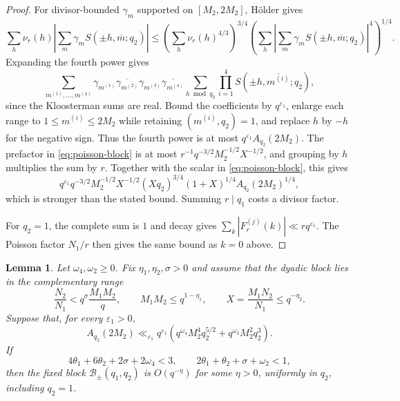 \documentclass[12pt, a4paper]{amsart}
\numberwithin{equation}{section}
\renewcommand{\le}{\leqslant}
\renewcommand{\ge}{\geqslant}
\theoremstyle{plain}
\newtheorem{lem}{Lemma}[section]
\begin{document}
\begin{proof}
For divisor-bounded $\gamma_m$ supported on $[M_2,2M_2]$, H\"older gives
$$
\sum_h\nu_r(h)
\left|
\sum_m\gamma_mS(\pm h,\overline{m};q_2)
\right|
\le
\left(\sum_h\nu_r(h)^{4/3}\right)^{3/4}
\left(\sum_h\left|\sum_m\gamma_mS(\pm h,\overline{m};q_2)\right|^4\right)^{1/4}.
$$
Expanding the fourth power gives
$$
\sum_{m^{(1)},\ldots,m^{(4)}}\gamma_{m^{(1)}}\overline{\gamma_{m^{(2)}}}\gamma_{m^{(3)}}\overline{\gamma_{m^{(4)}}}\sum_{h\bmod q_2}\prod_{i=1}^4S(\pm h,\overline{m^{(i)}};q_2),
$$
since the Kloosterman sums are real. Bound the coefficients by $q^{\varepsilon_1}$, enlarge each range to $1\le m^{(i)}\le2M_2$ while retaining $(m^{(i)},q_2)=1$, and replace $h$ by $-h$ for the negative sign. Thus the fourth power is at most $q^{\varepsilon_1}A_{q_2}(2M_2)$. The prefactor in \eqref{eq:poisson-block} is at most $r^{-1}q^{-3/2}M_2^{-1/2}X^{-1/2}$, and grouping by $h$ multiplies the sum by $r$. Together with the scalar in \eqref{eq:poisson-block}, this gives
$$
q^{\varepsilon_1}q^{-3/2}M_2^{-1/2}X^{-1/2}(Xq_2)^{3/4}(1+X)^{1/4}A_{q_2}(2M_2)^{1/4},
$$
which is stronger than the stated bound. Summing $r\mid q_1$ costs a divisor factor.

For $q_2=1$, the complete sum is $1$ and decay gives $\sum_k|F_r^{(j)}(k)|\ll rq^{\varepsilon_1}$. The Poisson factor $N_1/r$ then gives the same bound as $k=0$ above.
\end{proof}

\begin{lem}\label{lem:two-term-mixed-block-insertion}
Let $\omega_4,\omega_2\ge0$. Fix $\eta_1,\eta_2,\sigma>0$ and assume that the dyadic block lies in the complementary range
$$
\frac{N_2}{N_1}<q^\sigma\frac{M_1M_2}{q},\qquad
M_1M_2\le q^{1-\eta_1},\qquad
X=\frac{M_1N_2}{N_1}\le q^{-\eta_2}.
$$
Suppose that, for every $\varepsilon_1>0$,
$$
A_{q_2}(2M_2)\ll_{\varepsilon_1} q^{\varepsilon_1}
(q^{\omega_4}M_2^4q_2^{5/2}+q^{\omega_2}M_2^2q_2^3).
$$
If
$$
4\theta_1+6\theta_2+2\sigma+2\omega_4<3,
\qquad
2\theta_1+\theta_2+\sigma+\omega_2<1,
$$
 then the fixed block $\mathcal B_\pm(q_1,q_2)$ is $O(q^{-\eta})$ for some $\eta>0$, uniformly in $q_2$, including $q_2=1$.
\end{lem}
\end{document}
